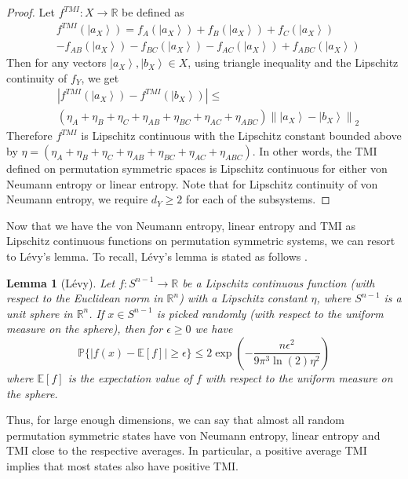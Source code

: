 \documentclass[pre,aps,showpacs,showkeys,twocolumn]{revtex4-1}
\newtheorem{lemma}{Lemma}[]
\newcommand\norm[1]{\left\lVert#1\right\rVert}
\newcommand\ket[1]{\left|#1\right\rangle}
\theoremstyle{definition}
\theoremstyle{remark}
\begin{document}
\begin{proof}
    Let $f^{TMI}\colon X \to \mathbb{R}$ be defined as 
    \begin{align*}
       & f^{TMI}(\ket{a_X}) = f_A(\ket{a_X}) + f_B(\ket{a_X}) + f_C(\ket{a_X}) \\
                                                  &- f_{AB}(\ket{a_X}) - f_{BC}(\ket{a_X}) - f_{AC}(\ket{a_X}) + f_{ABC}(\ket{a_X})
    \end{align*}
    Then for any vectors $\ket{a_X}, \ket{b_X} \in X$, using triangle inequality and the Lipschitz continuity of $f_Y$, we get
    \begin{align*}
        &|f^{TMI}(\ket{a_X}) - f^{TMI}(\ket{b_X})|
                               \leq \\ &(\eta_A + \eta_B + \eta_C + \eta_{AB} + \eta_{BC} 
                                     + \eta_{AC} + \eta_{ABC}) \norm{\ket{a_X} - \ket{b_X}}_2
    \end{align*}
    Therefore $f^{TMI}$ is Lipschitz continuous with the Lipschitz constant bounded above by $\eta = (\eta_A + \eta_B + \eta_C + \eta_{AB} + \eta_{BC} + \eta_{AC} + \eta_{ABC})$. In other words, the TMI defined on permutation symmetric spaces is Lipschitz continuous for either von Neumann entropy or linear entropy. Note that for Lipschitz continuity of von Neumann entropy, we require $d_Y \geq 2$ for each of the subsystems.
\end{proof}

Now that we have the von Neumann entropy, linear entropy and TMI as Lipschitz continuous functions on permutation symmetric systems, we can resort to L\'evy's lemma. To recall, L\'evy's lemma is stated as follows \cite{hayden2006aspects}.

\begin{lemma}[L\'evy]
    Let $f\colon S^{n - 1} \to \mathbb{R}$ be a Lipschitz continuous function \textnormal{(}with respect to the Euclidean norm in $\mathbb{R}^{n}$\textnormal{)} with a Lipschitz constant $\eta$, where $S^{n - 1}$ is a unit sphere in $\mathbb{R}^{n}$. If $x \in S^{n - 1}$ is picked randomly \textnormal{(}with respect to the uniform measure on the sphere\textnormal{)}, then for $\epsilon \geq 0$ we have
    \begin{equation*}
        \mathbb{P}\{|f(x) - \mathbb{E}[f]| \geq \epsilon\} \leq 2 \exp\left(- \frac{n \epsilon^2}{9 \pi^3 \ln(2) \eta^2}\right)
    \end{equation*}
    where $\mathbb{E}[f]$ is the expectation value of $f$ with respect to the uniform measure on the sphere.
\end{lemma}
Thus, for large enough dimensions, we can say that almost all random permutation symmetric states have von Neumann entropy, linear entropy and TMI close to the respective averages. In particular, a positive average TMI implies that most states also have positive TMI.
\end{document}
